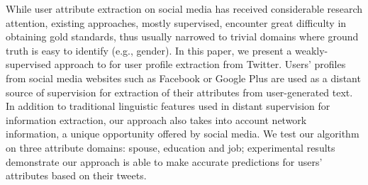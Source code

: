 While user attribute extraction on social media has received considerable research attention, existing approaches, mostly supervised, encounter great difficulty in obtaining gold standards, thus usually narrowed to trivial domains where ground truth is easy to identify (e.g., gender). In this paper, we present a weakly-supervised approach to for user profile extraction from Twitter.  Users' profiles from social media websites such as Facebook or Google Plus are used as a distant source of supervision for extraction of their attributes from user-generated text.  In addition to traditional linguistic features used in distant supervision for information extraction, our approach also takes into account network information, a unique opportunity offered by social media.  We test our algorithm on three attribute domains: spouse, education and job; experimental results demonstrate our approach is able to make accurate predictions for users' attributes based on their tweets.
